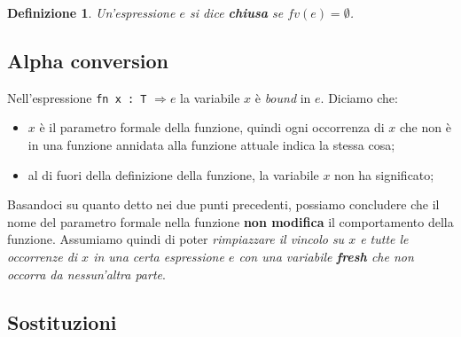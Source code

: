 \documentclass[a4paper, 11pt]{article}
\newtheorem{definit}{Definizione}[section]
\begin{document}
\begin{definit}
	Un'espressione $e$ si dice \textbf{chiusa} se $fv(e) = \emptyset$.
\end{definit}

\subsection{Alpha conversion}
Nell'espressione \lstinline|fn x : T| $\Rightarrow e$ la variabile $x$ è \textit{bound} in $e$. Diciamo che: \begin{itemize}
	\item $x$ è il parametro formale della funzione, quindi ogni occorrenza di $x$ che non è in una funzione annidata alla funzione attuale indica la stessa cosa;
	\item al di fuori della definizione della funzione, la variabile $x$ non ha significato;
\end{itemize}

Basandoci su quanto detto nei due punti precedenti, possiamo concludere che il nome del parametro formale nella funzione \textbf{non modifica} il comportamento della funzione. Assumiamo quindi di poter \textit{rimpiazzare il vincolo su $x$ e tutte le occorrenze di $x$ in una certa espressione $e$ con una variabile \textbf{fresh} che non occorra da nessun'altra parte}.

\subsection{Sostituzioni}
\end{document}
